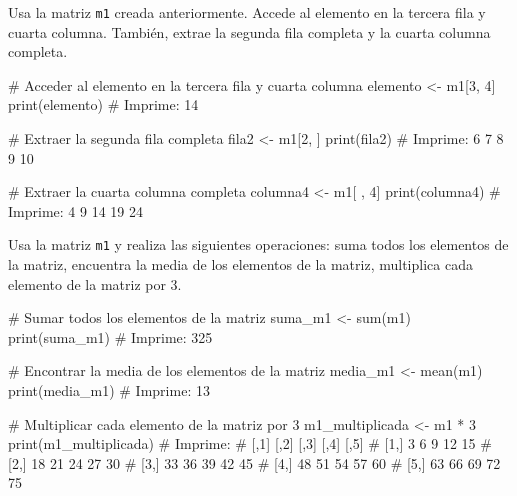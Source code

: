 \documentclass[
  letterpaper,
  DIV=11,
  numbers=noendperiod]{scrreprt}
\newenvironment{Shaded}{\begin{snugshade}}{\end{snugshade}}
\newcommand{\CommentTok}[1]{\textcolor[rgb]{0.37,0.37,0.37}{#1}}
\newcommand{\DecValTok}[1]{\textcolor[rgb]{0.68,0.00,0.00}{#1}}
\newcommand{\FunctionTok}[1]{\textcolor[rgb]{0.28,0.35,0.67}{#1}}
\newcommand{\NormalTok}[1]{\textcolor[rgb]{0.00,0.23,0.31}{#1}}
\newcommand{\OtherTok}[1]{\textcolor[rgb]{0.00,0.23,0.31}{#1}}
\newcommand{\SpecialCharTok}[1]{\textcolor[rgb]{0.37,0.37,0.37}{#1}}
\begin{document}
Usa la matriz \texttt{m1} creada anteriormente. Accede al elemento en la
tercera fila y cuarta columna. También, extrae la segunda fila completa
y la cuarta columna completa.

\begin{Shaded}
\begin{Highlighting}[]
\CommentTok{\# Acceder al elemento en la tercera fila y cuarta columna}
\NormalTok{elemento }\OtherTok{\textless{}{-}}\NormalTok{ m1[}\DecValTok{3}\NormalTok{, }\DecValTok{4}\NormalTok{]}
\FunctionTok{print}\NormalTok{(elemento)}
\CommentTok{\# Imprime: 14}

\CommentTok{\# Extraer la segunda fila completa}
\NormalTok{fila2 }\OtherTok{\textless{}{-}}\NormalTok{ m1[}\DecValTok{2}\NormalTok{, ]}
\FunctionTok{print}\NormalTok{(fila2)}
\CommentTok{\# Imprime: 6 7 8 9 10}

\CommentTok{\# Extraer la cuarta columna completa}
\NormalTok{columna4 }\OtherTok{\textless{}{-}}\NormalTok{ m1[ , }\DecValTok{4}\NormalTok{]}
\FunctionTok{print}\NormalTok{(columna4)}
\CommentTok{\# Imprime: 4 9 14 19 24}
\end{Highlighting}
\end{Shaded}

Usa la matriz \texttt{m1} y realiza las siguientes operaciones: suma
todos los elementos de la matriz, encuentra la media de los elementos de
la matriz, multiplica cada elemento de la matriz por 3.

\begin{Shaded}
\begin{Highlighting}[]
\CommentTok{\# Sumar todos los elementos de la matriz}
\NormalTok{suma\_m1 }\OtherTok{\textless{}{-}} \FunctionTok{sum}\NormalTok{(m1)}
\FunctionTok{print}\NormalTok{(suma\_m1)}
\CommentTok{\# Imprime: 325}

\CommentTok{\# Encontrar la media de los elementos de la matriz}
\NormalTok{media\_m1 }\OtherTok{\textless{}{-}} \FunctionTok{mean}\NormalTok{(m1)}
\FunctionTok{print}\NormalTok{(media\_m1)}
\CommentTok{\# Imprime: 13}

\CommentTok{\# Multiplicar cada elemento de la matriz por 3}
\NormalTok{m1\_multiplicada }\OtherTok{\textless{}{-}}\NormalTok{ m1 }\SpecialCharTok{*} \DecValTok{3}
\FunctionTok{print}\NormalTok{(m1\_multiplicada)}
\CommentTok{\# Imprime:}
\CommentTok{\#      [,1] [,2] [,3] [,4] [,5]}
\CommentTok{\# [1,]    3    6    9   12   15}
\CommentTok{\# [2,]   18   21   24   27   30}
\CommentTok{\# [3,]   33   36   39   42   45}
\CommentTok{\# [4,]   48   51   54   57   60}
\CommentTok{\# [5,]   63   66   69   72   75}
\end{Highlighting}
\end{Shaded}
\end{document}
